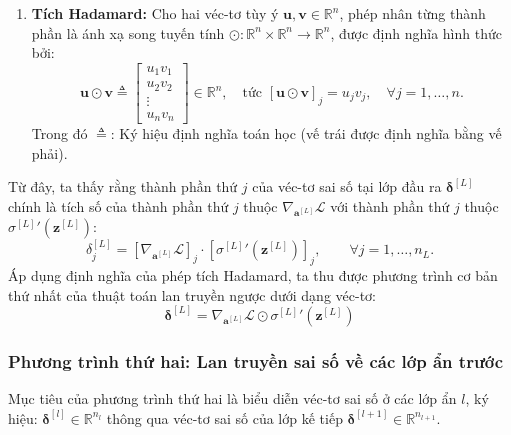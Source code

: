 \begin{enumerate}
\begin{equation}
\begin{bmatrix}
    \vdots \\ 
    {\sigma^{[L]}}'\!\left(z_{n_L}^{[L]}\right) 
    \end{bmatrix} \in \mathbb{R}^{n_L}.
    \end{equation}
    Trong đó $\triangleq$: Ký hiệu định nghĩa toán học (vế trái được định nghĩa bằng vế phải).
    \item \textbf{Tích Hadamard:} Cho hai véc-tơ tùy ý $\mathbf{u}, \mathbf{v} \in \mathbb{R}^n$, phép nhân từng thành phần là ánh xạ song tuyến tính $\odot: \mathbb{R}^n \times \mathbb{R}^n \to \mathbb{R}^n$, được định nghĩa hình thức bởi:
    \begin{equation}
    \mathbf{u} \odot \mathbf{v} \triangleq 
    \begin{bmatrix} 
    u_1 v_1 \\ 
    u_2 v_2 \\ 
    \vdots \\ 
    u_n v_n 
    \end{bmatrix} \in \mathbb{R}^n, \quad \text{tức } [\mathbf{u} \odot \mathbf{v}]_j = u_j v_j, \quad \forall j = 1, \dots, n.
    \end{equation}
    Trong đó $\triangleq$: Ký hiệu định nghĩa toán học (vế trái được định nghĩa bằng vế phải).
\end{enumerate}
Từ đây, ta thấy rằng thành phần thứ $j$ của véc-tơ sai số tại lớp đầu ra $\boldsymbol{\delta}^{[L]}$ chính là tích số của thành phần thứ $j$ thuộc $\nabla_{\mathbf{a}^{[L]}}\mathcal{L}$ với thành phần thứ $j$ thuộc ${\sigma^{[L]}}'\!\left(\mathbf{z}^{[L]}\right)$:
\begin{equation}
\delta_j^{[L]} = \left[ \nabla_{\mathbf{a}^{[L]}}\mathcal{L} \right]_j \cdot \left[ {\sigma^{[L]}}'\!\left(\mathbf{z}^{[L]}\right) \right]_j, \qquad \forall j = 1, \dots, n_L.
\end{equation}
Áp dụng định nghĩa của phép tích Hadamard, ta thu được phương trình cơ bản thứ nhất của thuật toán lan truyền ngược dưới dạng véc-tơ:
\begin{equation}
\boxed{
\boldsymbol{\delta}^{[L]} = \nabla_{\mathbf{a}^{[L]}}\mathcal{L} \odot {\sigma^{[L]}}'\!\left(\mathbf{z}^{[L]}\right)}
\label{eq:bp_vector}
\end{equation}
\subsubsection{Phương trình thứ hai: Lan truyền sai số về các lớp ẩn trước}
Mục tiêu của phương trình thứ hai là biểu diễn véc-tơ sai số ở các lớp ẩn $l$, ký hiệu: $\boldsymbol{\delta}^{[l]} \in \mathbb{R}^{n_l}$ thông qua véc-tơ sai số của lớp kế tiếp $\boldsymbol{\delta}^{[l+1]} \in \mathbb{R}^{n_{l+1}}$.
